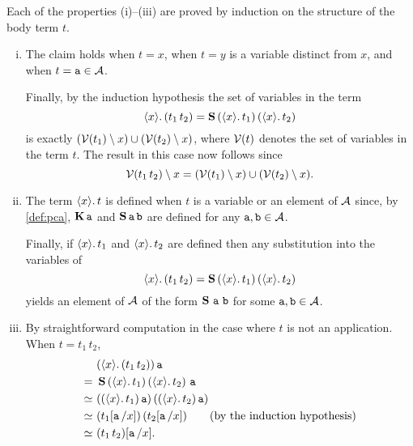


Each of the properties (i)--(iii) are proved by induction on the structure of the
body term \(t\).

\begin{enumerate}[(i)]
  \item
    The claim holds when \(t = x\),
    when \(t = y\) is a variable distinct from \(x\),
    and when \(t = \pca a \in \AA\).

    Finally, by the induction hypothesis the set of variables in the term
    \[ \lambdapca{x}{(t_1\,t_2)} =
      \scomb\,(\lambdapca{x}{t_1})\,(\lambdapca{x}{t_2}) \]
    is exactly
    \((\Var{t_1} \setminus x) \cup (\Var{t_2} \setminus x)\),
    where \(\Var t\) denotes the set of variables in the term \(t\).
    The result in this case now follows since
    \[ \Var{t_1\,t_2} \setminus x =
      (\Var{t_1} \setminus x) \cup (\Var{t_2} \setminus x). \]

  \item
    The term \(\lambdapca{x}{t}\) is defined when \(t\) is a variable or an
    element of \(\AA\) since, by \cref{def:pca}, \(\kcomb \pca a\) and
    \(\scomb \pca a \pca b\) are defined for any \(\pca a, \pca b \in \AA\).

    Finally, if \(\lambdapca{x}{t_1}\) and \(\lambdapca{x}{t_2}\) are
    defined then any substitution into the variables of
    \[ \lambdapca{x}{(t_1\,t_2)} =
      \scomb\,(\lambdapca{x}{t_1})\,(\lambdapca{x}{t_2}) \]
    yields an element of \(\AA\) of the form \(\scomb\,\pca a\,\pca b\)
    for some $\pca a, \pca b \in \AA$.

  \item
    By straightforward computation in the case where \(t\) is not an
    application.
    When \(t = t_1\,t_2\),
    \begin{align*}
         & (\lambdapca{x}{(t_1\,t_2)}) \pca a \\
      =\ & \scomb \, (\lambdapca{x}{t_1}) \, (\lambdapca{x}{t_2}) \, \pca a \\
      \simeq\ & ((\lambdapca{x}{t_1}) \pca a) \, ((\lambdapca{x}{t_2}) \pca a) \\
      \simeq\ & (t_1[\pca a/x]) \, (t_2[\pca a/x])
        \qquad \text{(by the induction hypothesis)} \\
      \simeq\ & (t_1\,t_2)[\pca a/x].
    \end{align*}
\end{enumerate}

